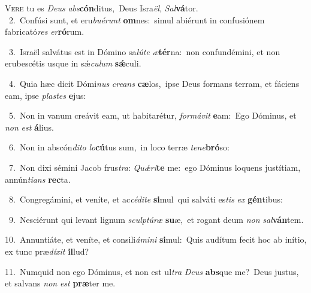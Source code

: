 \lettrine{\initial\textcolor{\initialcolor}{V}}{ere} tu es \textit{De}\-\textit{us} \textit{abs}\-\textbf{cón}ditus,~\star Deus Isra\-\textit{ël}\-, \textit{Sal}\-\textbf{vá}tor.\\
{\numbfont\textcolor{\numbcolor}{~2.}}~Confúsi sunt, et eru\-\textit{bu}\-\textit{é}\textit{runt} \textbf{om}\-nes:~\star simul abiérunt in confusiónem fabricató\textit{res} \textit{er}\-\textbf{ró}rum.\par
{\numbfont\textcolor{\numbcolor}{~3.}}~Israël salvátus est in Dómino sa\-\textit{lú}\-\textit{te} \textit{æ}\-\textbf{tér}na:~\star non confundémini, et non erubescétis usque in sǽ\-\textit{cu}\-\textit{lum} \textbf{sǽ}\-culi.\par
{\numbfont\textcolor{\numbcolor}{~4.}}~Quia hæc dicit Dómi\textit{nus} \textit{cre}\-\textit{ans} \textbf{cæ}\-los,~\star ipse Deus formans terram, et fáciens eam, ipse \textit{plas}\-\textit{tes} \textbf{e}\-jus:\par
{\numbfont\textcolor{\numbcolor}{~5.}}~Non in vanum creávit eam, ut habitarétur, \textit{for}\-\textit{má}\textit{vit} \textbf{e}\-am:~\star Ego Dóminus, et \textit{non} \textit{est} \textbf{á}\-lius.\par
{\numbfont\textcolor{\numbcolor}{~6.}}~Non in abscón\-\textit{di}\-\textit{to} \textit{lo}\-\textbf{cú}tus sum,~\star in loco terræ \textit{te}\-\textit{ne}\textbf{bró}so:\par
{\numbfont\textcolor{\numbcolor}{~7.}}~Non dixi sémini Jacob frus\-\textit{tra}\-: \textit{Quǽ}\-\textit{ri}\textbf{te} me:~\star ego Dóminus loquens justítiam, annún\-\textit{ti}\-\textit{ans} \textbf{rec}\-ta.\par
{\numbfont\textcolor{\numbcolor}{~8.}}~Congregámini, et veníte, et ac\-\textit{cé}\-\textit{di}\textit{te} \textbf{si}\-mul~\star qui salváti es\textit{tis} \textit{ex} \textbf{gén}\-tibus:\par
{\numbfont\textcolor{\numbcolor}{~9.}}~Nesciérunt qui levant lignum \textit{sculp}\-\textit{tú}\textit{ræ} \textbf{su}\-æ,~\star et rogant deum \textit{non} \textit{sal}\-\textbf{ván}tem.\par
{\numbfont\textcolor{\numbcolor}{10.}}~Annuntiáte, et veníte, et consili\-\textit{á}\-\textit{mi}\textit{ni} \textbf{si}\-mul:~\star Quis audítum fecit hoc ab inítio, ex tunc præ\-\textit{dí}\-\textit{xit} \textbf{il}\-lud?\par
{\numbfont\textcolor{\numbcolor}{11.}}~Numquid non ego Dóminus, et non est ul\textit{tra} \textit{De}\-\textit{us} \textbf{abs}\-que me?~\star Deus justus, et salvans \textit{non} \textit{est} \textbf{præ}\-ter me.\par
